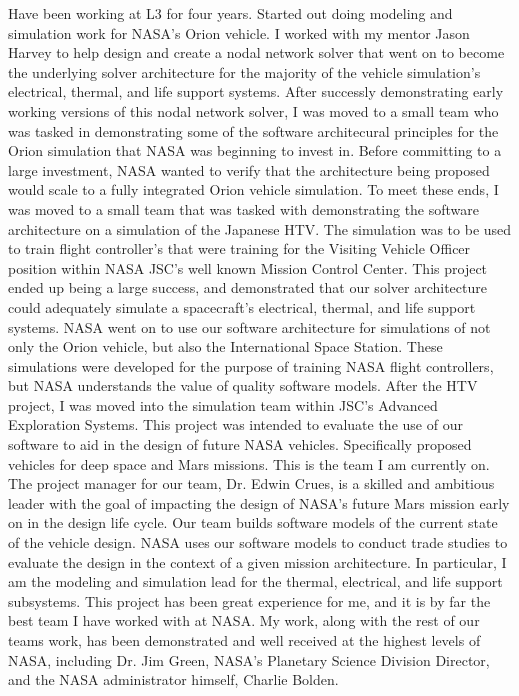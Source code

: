 \documentclass{article}
\begin{document}
Have been working at L3 for four years. Started out doing modeling and simulation work
for NASA's Orion vehicle. I worked with my mentor Jason Harvey to help design and create
a nodal network solver that went on to become the underlying solver architecture for the
majority of the vehicle simulation's electrical, thermal, and life support systems.
After successly demonstrating early working versions of this nodal network solver, I was moved
to a small team who was tasked in demonstrating some of the software architecural principles
for the Orion simulation that NASA was beginning to invest in.
Before committing to a large investment, NASA wanted to verify that the architecture being proposed would
scale to a fully integrated Orion vehicle simulation. To meet these ends, I was moved to a small
team that was tasked with demonstrating the software architecture on a simulation of the Japanese
HTV. The simulation was to be used to train flight controller's that were training for the 
Visiting Vehicle Officer position within NASA JSC's well known Mission Control Center.
This project ended up being a large success, and demonstrated that our solver architecture
could adequately simulate a spacecraft's electrical, thermal, and life support systems.
NASA went on to use our software architecture for simulations of not only the Orion vehicle, but
also the International Space Station. These simulations were developed for the purpose of training
NASA flight controllers, but NASA understands the value of quality software models. After the 
HTV project, I was moved into the simulation team within JSC's Advanced Exploration Systems.
This project was intended to evaluate the use of our software to aid in the design of future
NASA vehicles. Specifically proposed vehicles for deep space and Mars missions. This is
the team I am currently on.
The project manager for our team, Dr. Edwin Crues, is a skilled and ambitious leader with 
the goal of impacting the design of NASA's future Mars mission early on in the design life cycle. 
Our team builds software models of the current state of the vehicle design. NASA uses our software
models to conduct trade studies to evaluate the design in the context of a given mission architecture.
In particular, I am the modeling and simulation lead for the thermal, electrical, and life support
subsystems. This project has been great experience for me, and it is by far the best team I have worked
with at NASA. My work, along with the rest of our teams work, has been demonstrated and well received 
at the highest levels of NASA, including Dr. Jim Green, NASA's Planetary Science Division Director, and 
the NASA administrator himself, Charlie Bolden.
\end{document}
